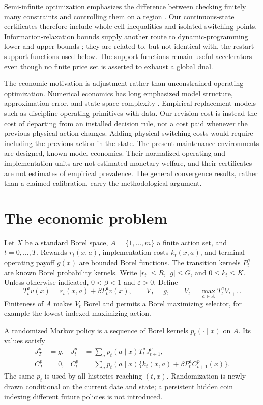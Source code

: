 Semi-infinite optimization emphasizes the difference between checking finitely many constraints and controlling them on a region \citep{HettichKortanek1993}. Our continuous-state certificates therefore include whole-cell inequalities and isolated switching points. Information-relaxation bounds supply another route to dynamic-programming lower and upper bounds \citep{BrownSmithSun2010,BrownSmith2014}; they are related to, but not identical with, the restart support functions used below. The support functions remain useful accelerators even though no finite price set is asserted to exhaust a global dual.

The economic motivation is adjustment rather than unconstrained operating optimization. Numerical economics has long emphasized model structure, approximation error, and state-space complexity \citep{Judd1998,BrummScheidegger2017}. Empirical replacement models such as \citet{Rust1987} discipline operating primitives with data. Our revision cost is instead the cost of departing from an installed decision rule, not a cost paid whenever the previous physical action changes. Adding physical switching costs would require including the previous action in the state. The present maintenance environments are designed, known-model economies. Their normalized operating and implementation units are not estimated monetary welfare, and their certificates are not estimates of empirical prevalence. The general convergence results, rather than a claimed calibration, carry the methodological argument.

\section{The economic problem}\label{sec:model}
Let $X$ be a standard Borel space, $A=\{1,\ldots,m\}$ a finite action set, and $t=0,\ldots,T$. Rewards $r_t(x,a)$, implementation costs $k_t(x,a)$, and terminal operating payoff $g(x)$ are bounded Borel functions. The transition kernels $P_t^a$ are known Borel probability kernels. Write $|r_t|\leq R$, $|g|\leq G$, and $0\leq k_t\leq K$. Unless otherwise indicated, $0<\beta<1$ and $\varepsilon>0$. Define
\begin{equation}\label{eq:bellman}
 T_t^a v(x)=r_t(x,a)+\beta P_t^a v(x),\qquad
 V_T=g,\qquad V_t=\max_{a\in A}T_t^aV_{t+1}.
\end{equation}
Finiteness of $A$ makes $V_t$ Borel and permits a Borel maximizing selector, for example the lowest indexed maximizing action.

A randomized Markov policy is a sequence of Borel kernels $p_t(\cdot\mid x)$ on $A$. Its values satisfy
\begin{align}
 J_T^p&=g,& J_t^p&=\sum_a p_t(a\mid x)T_t^aJ_{t+1}^p,\label{eq:operating}\\
 C_T^p&=0,& C_t^p&=\sum_a p_t(a\mid x)\{k_t(x,a)+\beta P_t^aC_{t+1}^p(x)\}.\label{eq:cost}
\end{align}
The same $p_t$ is used by all histories reaching $(t,x)$. Randomization is newly drawn conditional on the current date and state; a persistent hidden coin indexing different future policies is not introduced.

